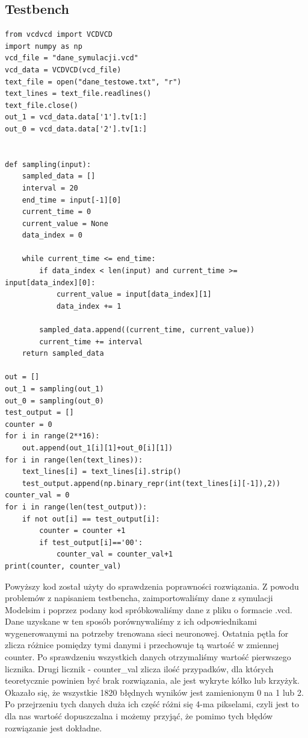 \documentclass[a4paper, titleauthor]{mwart}
\begin{document}
\subsection{Testbench}
\begin{lstlisting}
from vcdvcd import VCDVCD
import numpy as np
vcd_file = "dane_symulacji.vcd"
vcd_data = VCDVCD(vcd_file)
text_file = open("dane_testowe.txt", "r")
text_lines = text_file.readlines()
text_file.close()
out_1 = vcd_data.data['1'].tv[1:]
out_0 = vcd_data.data['2'].tv[1:]


def sampling(input):
    sampled_data = []
    interval = 20
    end_time = input[-1][0]
    current_time = 0
    current_value = None
    data_index = 0

    while current_time <= end_time:
        if data_index < len(input) and current_time >= input[data_index][0]:
            current_value = input[data_index][1]
            data_index += 1

        sampled_data.append((current_time, current_value))
        current_time += interval
    return sampled_data

out = []
out_1 = sampling(out_1)
out_0 = sampling(out_0)
test_output = []
counter = 0
for i in range(2**16):
    out.append(out_1[i][1]+out_0[i][1])
for i in range(len(text_lines)):
    text_lines[i] = text_lines[i].strip()
    test_output.append(np.binary_repr(int(text_lines[i][-1]),2))
counter_val = 0
for i in range(len(test_output)):
    if not out[i] == test_output[i]:
        counter = counter +1
        if test_output[i]=='00':
            counter_val = counter_val+1
print(counter, counter_val)
\end{lstlisting}
Powyższy kod został użyty do sprawdzenia poprawności rozwiązania. Z powodu problemów z napisaniem testbencha, zaimportowaliśmy dane z symulacji Modelsim i poprzez podany kod spróbkowaliśmy dane z pliku o formacie .vcd. Dane uzyskane w ten sposób porównywaliśmy z ich odpowiednikami wygenerowanymi na potrzeby trenowana sieci neuronowej. Ostatnia pętla for zlicza różnice pomiędzy tymi danymi i przechowuje tą wartość w zmiennej counter. Po sprawdzeniu wszystkich danych otrzymaliśmy wartość pierwszego licznika. Drugi licznik - counter\_val zlicza ilość przypadków, dla których teoretycznie powinien być brak rozwiązania, ale jest wykryte kółko lub krzyżyk. Okazało się, że wszystkie 1820 błędnych wyników jest zamienionym 0 na 1 lub 2. Po przejrzeniu tych danych duża ich część różni się 4-ma pikselami, czyli jest to dla nas wartość dopuszczalna i możemy przyjąć, że pomimo tych błędów rozwiązanie jest dokładne.
\end{document}
